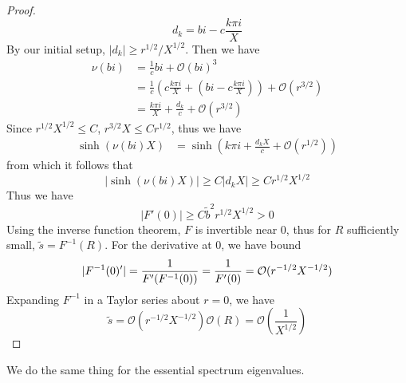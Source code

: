 \documentclass[thesis.tex]{subfiles}
\begin{document}
\begin{lemma}
\begin{proof}
\[
d_k = bi - c\frac{k \pi i}{X}
\]
By our initial setup, $|d_k| \geq r^{1/2}/X^{1/2}$. Then we have
\begin{align*} 
\nu(bi) &= \frac{1}{c}bi + \mathcal{O}(bi)^3 \\
&= \frac{1}{c}\left( c\frac{k \pi i}{X} + \left( bi - c\frac{k \pi i}{X}\right) \right) + \mathcal{O}(r^{3/2}) \\
&= \frac{k \pi i}{X} + \frac{d_k}{c} + \mathcal{O}(r^{3/2})
\end{align*}
Since $r^{1/2}X^{1/2} \leq C$, $r^{3/2}X \leq C r^{1/2}$, thus we have
\begin{align*} 
\sinh( \nu(bi)X) &= \sinh\left( k \pi i + \frac{d_k X}{c} + \mathcal{O}(r^{1/2}) \right)
\end{align*}
from which it follows that
\[
|\sinh( \nu(bi)X)| \geq C |d_k X| \geq C r^{1/2}X^{1/2}
\]
Thus we have
\[
|F'(0)| \geq C \tilde{b}^2 r^{1/2}X^{1/2} > 0
\]
Using the inverse function theorem, $F$ is invertible near 0, thus for $R$ sufficiently small, $\tilde{s} = F^{-1}(R)$. For the derivative at 0, we have bound
\[
|F^{-1}(0)'| = \frac{1}{F'(F^{-1}(0))} \\
= \frac{1}{F'(0)} = \mathcal{O}(r^{-1/2}X^{-1/2})
\]
Expanding $F^{-1}$ in a Taylor series about $r = 0$, we have
\[
\tilde{s} = \mathcal{O}(r^{-1/2}X^{-1/2}) \mathcal{O}(R) = \mathcal{O}\left( \frac{1}{X^{1/2}}\right)
\]
\end{proof}
\end{lemma}

We do the same thing for the essential spectrum eigenvalues.
\end{document}
